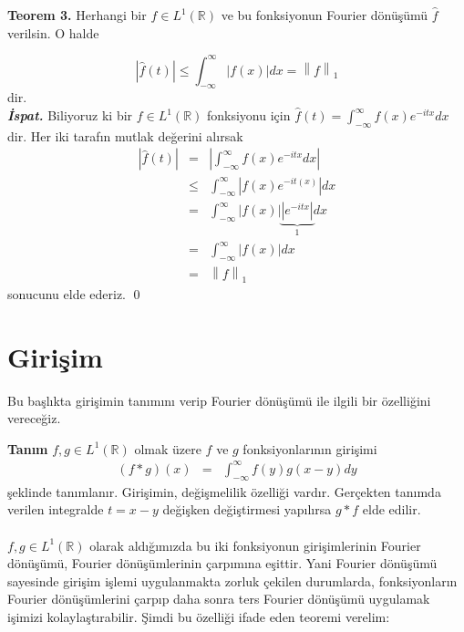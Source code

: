 \documentclass[a4paper, 9pt]{article}
\begin{document}
\textbf{Teorem 3.} Herhangi bir $f\in L^1(\mathbb{R})$ ve bu fonksiyonun Fourier dönüşümü $\widehat{f}$ verilsin. O halde

$$ \left| \widehat{f}(t) \right| \leq \int_{-\infty}^{\infty} \left| f(x) \right| dx = \left \| f \right \|_{1}  $$
dir. \\
\textit{\textbf{İspat.}} Biliyoruz ki bir $f \in L^1(\mathbb{R})$ fonksiyonu için $\widehat{f}(t) =  \int_{-\infty }^{\infty } f(x) e^{-itx}dx$ dir. Her iki tarafın mutlak değerini alırsak
	\begin{eqnarray*} 
		\left| \widehat{f}(t) \right| &=& \left| \int_{-\infty }^{\infty } f(x) e^{-itx}dx \right| \\
		&\leq &  \int_{-\infty }^{ \infty } \left| f(x)e^{-it(x)} \right| dx \\   
		&=& \int_{- \infty}^{\infty} \left| f(x) \right| \underbrace{\left| e^{-itx} \right| }_{1} dx \\
		&=& \int_{- \infty}^{\infty} \left| f(x) \right| dx \\
		&=& \left \| f \right \|_{1}
	\end{eqnarray*}
sonucunu elde ederiz. \qed

\section{Girişim}

Bu başlıkta girişimin tanımını verip Fourier dönüşümü ile ilgili bir özelliğini vereceğiz.

\textbf{Tanım} $f,g \in L^1(\mathbb{R})$ olmak üzere $f$ ve $g$ fonksiyonlarının girişimi
\begin{eqnarray*} 
 \left( f\ast g \right) (x) &=& \int_{- \infty}^{\infty} f(y) g(x-y) dy
\end{eqnarray*}
şeklinde tanımlanır. Girişimin, değişmelilik özelliği vardır. Gerçekten tanımda verilen integralde $t=x-y$ değişken değiştirmesi yapılırsa $g\ast f$ elde edilir.

\paragraph{}
$f,g \in L^1(\mathbb{R})$ olarak aldığımızda bu iki fonksiyonun girişimlerinin Fourier dönüşümü, Fourier dönüşümlerinin çarpımına eşittir. Yani Fourier dönüşümü sayesinde girişim işlemi uygulanmakta zorluk çekilen durumlarda, fonksiyonların Fourier dönüşümlerini çarpıp daha sonra ters Fourier dönüşümü uygulamak işimizi kolaylaştırabilir. Şimdi bu özelliği ifade eden teoremi verelim:
\end{document}
